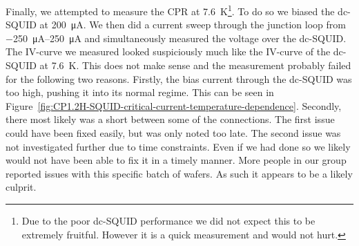 Finally, we attempted to measure the CPR at \qty{7.6}{\kelvin}\footnote{Due to the poor dc-SQUID performance we did not expect this to be extremely fruitful. However it is a quick measurement and would not hurt.}. To do so we biased the dc-SQUID at \qty{200}{\micro\ampere}. We then did a current sweep through the junction loop from \qtyrange{-250}{250}{\micro\ampere} and simultaneously measured the voltage over the dc-SQUID. The IV-curve we measured looked suspiciously much like the IV-curve of the dc-SQUID at \qty{7.6}{\kelvin}. This does not make sense and the measurement probably failed for the following two reasons. Firstly, the bias current through the dc-SQUID was too high, pushing it into its normal regime. This can be seen in Figure~\ref{fig:CP1.2H-SQUID-critical-current-temperature-dependence}. Secondly, there most likely was a short between some of the connections. The first issue could have been fixed easily, but was only noted too late. The second issue was not investigated further due to time constraints. Even if we had done so we likely would not have been able to fix it in a timely manner. More people in our group reported issues with this specific batch of  wafers. As such it appears to be a likely culprit.
